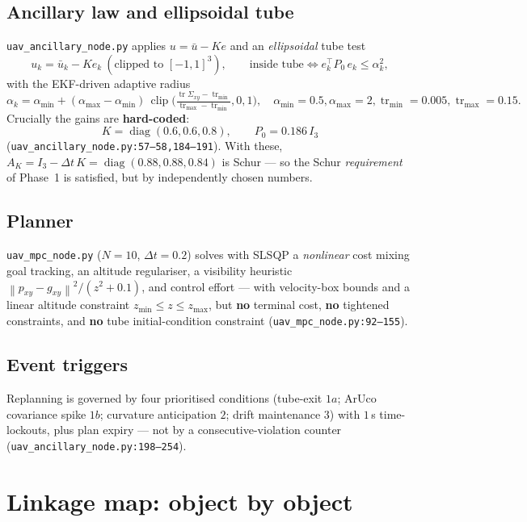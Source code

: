 \documentclass[11pt]{article}
\DeclareMathOperator{\tr}{tr}
\DeclareMathOperator{\diag}{diag}
\DeclareMathOperator{\clip}{clip}
\newcommand{\norm}[1]{\left\lVert #1 \right\rVert}
\newcommand{\code}[1]{\texttt{#1}}
\begin{document}
\subsection{Ancillary law and ellipsoidal tube}
\code{uav\_ancillary\_node.py} applies $u=\bar u-Ke$ and an \emph{ellipsoidal} tube test
\begin{equation}
u_k=\bar u_k-K e_k\ (\text{clipped to }[-1,1]^3),\qquad
\text{inside tube}\iff e_k^\top P_0\,e_k\le\alpha_k^2,
\label{eq:p3anc}
\end{equation}
with the EKF-driven adaptive radius
\begin{equation}
\alpha_k=\alpha_{\min}+(\alpha_{\max}-\alpha_{\min})\,
\clip\!\Big(\tfrac{\tr\Sigma_{xy}-\tr_{\min}}{\tr_{\max}-\tr_{\min}},0,1\Big),
\quad \alpha_{\min}=0.5,\alpha_{\max}=2,\tr_{\min}=0.005,\tr_{\max}=0.15 .
\label{eq:p3alpha}
\end{equation}
Crucially the gains are \textbf{hard-coded}:
\begin{equation}
K=\diag(0.6,0.6,0.8),\qquad P_0=0.186\,I_3
\end{equation}
(\code{uav\_ancillary\_node.py:57--58,184--191}). With these, $A_K=I_3-\Delta t\,K=
\diag(0.88,0.88,0.84)$ is Schur --- so the Schur \emph{requirement} of Phase~1 is satisfied, but by
independently chosen numbers.

\subsection{Planner}
\code{uav\_mpc\_node.py} ($N=10$, $\Delta t=0.2$) solves with SLSQP a \emph{nonlinear} cost mixing
goal tracking, an altitude regulariser, a visibility heuristic
$\norm{p_{xy}-g_{xy}}^2/(z^2+0.1)$, and control effort --- with velocity-box bounds and a linear
altitude constraint $z_{\min}\le z\le z_{\max}$, but \textbf{no} terminal cost, \textbf{no}
tightened constraints, and \textbf{no} tube initial-condition constraint
(\code{uav\_mpc\_node.py:92--155}).

\subsection{Event triggers}
Replanning is governed by four prioritised conditions (tube-exit $1a$; ArUco covariance spike
$1b$; curvature anticipation $2$; drift maintenance $3$) with $1$\,s time-lockouts, plus plan
expiry --- not by a consecutive-violation counter (\code{uav\_ancillary\_node.py:198--254}).

\section{Linkage map: object by object}
\end{document}
